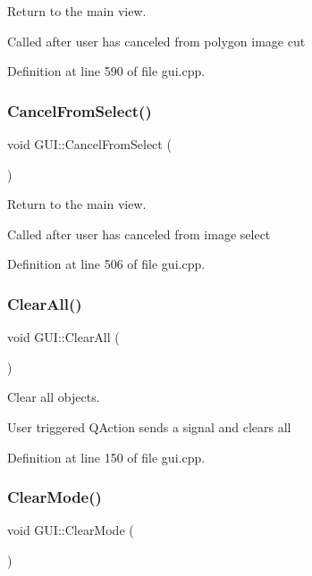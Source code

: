 Return to the main view. 

Called after user has canceled from polygon image cut 

Definition at line 590 of file gui.\+cpp.

\mbox{\label{classGUI_a3e6d9c2c9482bf8cb9655899b36e8bc1}} 
\subsubsection{\texorpdfstring{Cancel\+From\+Select()}{CancelFromSelect()}}
{\footnotesize\ttfamily void G\+U\+I\+::\+Cancel\+From\+Select (\begin{DoxyParamCaption}{ }\end{DoxyParamCaption})}



Return to the main view. 

Called after user has canceled from image select 

Definition at line 506 of file gui.\+cpp.

\mbox{\label{classGUI_a19c82a62a2b41460c81317fa967e3a1e}} 
\subsubsection{\texorpdfstring{Clear\+All()}{ClearAll()}}
{\footnotesize\ttfamily void G\+U\+I\+::\+Clear\+All (\begin{DoxyParamCaption}{ }\end{DoxyParamCaption})}



Clear all objects. 

User triggered Q\+Action sends a signal and clears all 

Definition at line 150 of file gui.\+cpp.

\mbox{\label{classGUI_afb6e169c9372800e69c70a3889420325}} 
\subsubsection{\texorpdfstring{Clear\+Mode()}{ClearMode()}}
{\footnotesize\ttfamily void G\+U\+I\+::\+Clear\+Mode (\begin{DoxyParamCaption}{ }\end{DoxyParamCaption})}



